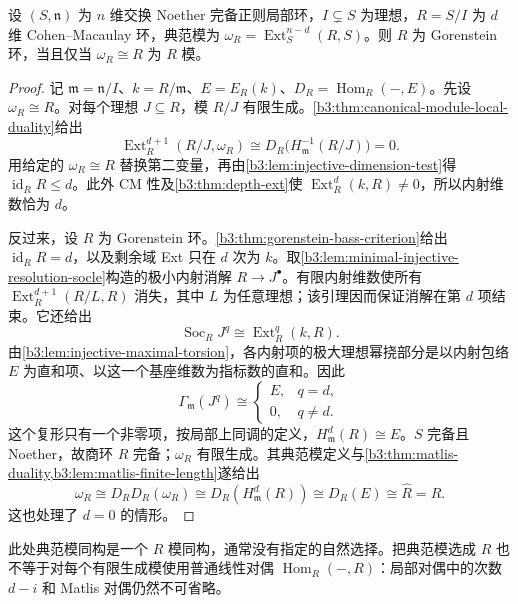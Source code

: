 \begin{proposition}\label{b3:prop:canonical-free-gorenstein}
	设 \((S,\mathfrak n)\) 为 \(n\) 维交换 Noether 完备正则局部环，\(I\subsetneq S\) 为理想，\(R=S/I\) 为 \(d\) 维 Cohen--Macaulay 环，典范模为 \(\omega_R=\operatorname{Ext}_S^{n-d}(R,S)\)。则 \(R\) 为 Gorenstein 环，当且仅当 \(\omega_R\cong R\) 为 \(R\) 模。
\end{proposition}
\begin{proof}
	记 \(\mathfrak m=\mathfrak n/I\)、\(k=R/\mathfrak m\)、\(E=E_R(k)\)、\(D_R=\operatorname{Hom}_R(-,E)\)。先设 \(\omega_R\cong R\)。对每个理想 \(J\subseteq R\)，模 \(R/J\) 有限生成。\cref{b3:thm:canonical-module-local-duality}给出
	\[
		\operatorname{Ext}_R^{d+1}(R/J,\omega_R) \cong D_R\bigl(H_{\mathfrak m}^{-1}(R/J)\bigr)=0.
	\]
	用给定的 \(\omega_R\cong R\) 替换第二变量，再由\cref{b3:lem:injective-dimension-test}得 \(\operatorname{id}_RR\le d\)。此外 CM 性及\cref{b3:thm:depth-ext}使 \(\operatorname{Ext}_R^d(k,R)\ne0\)，所以内射维数恰为 \(d\)。

	反过来，设 \(R\) 为 Gorenstein 环。\cref{b3:thm:gorenstein-bass-criterion}给出 \(\operatorname{id}_RR=d\)，以及剩余域 Ext 只在 \(d\) 次为 \(k\)。取\cref{b3:lem:minimal-injective-resolution-socle}构造的极小内射消解 \(R\to J^\bullet\)。有限内射维数使所有 \(\operatorname{Ext}_R^{d+1}(R/L,R)\) 消失，其中 \(L\) 为任意理想；该引理因而保证消解在第 \(d\) 项结束。它还给出
	\[
		\operatorname{Soc}_R J^q\cong\operatorname{Ext}_R^q(k,R).
	\]
	由\cref{b3:lem:injective-maximal-torsion}，各内射项的极大理想幂挠部分是以内射包络 \(E\) 为直和项、以这一个基座维数为指标数的直和。因此
	\[
		\Gamma_{\mathfrak m}(J^q)\cong
		\begin{cases}E,&q=d,\\0,&q\ne d.\end{cases}
	\]
	这个复形只有一个非零项，按局部上同调的定义，\(H^d_{\mathfrak m}(R)\cong E\)。\(S\) 完备且 Noether，故商环 \(R\) 完备；\(\omega_R\) 有限生成。其典范模定义与\cref{b3:thm:matlis-duality,b3:lem:matlis-finite-length}遂给出
	\[
		\omega_R\cong D_RD_R(\omega_R) \cong D_R(H^d_{\mathfrak m}(R)) \cong D_R(E) \cong\widehat R=R.
	\]
	这也处理了 \(d=0\) 的情形。
\end{proof}

此处典范模同构是一个 \(R\) 模同构，通常没有指定的自然选择。把典范模选成 \(R\) 也不等于对每个有限生成模使用普通线性对偶 \(\operatorname{Hom}_R(-,R)\)：局部对偶中的次数 \(d-i\) 和 Matlis 对偶仍然不可省略。

